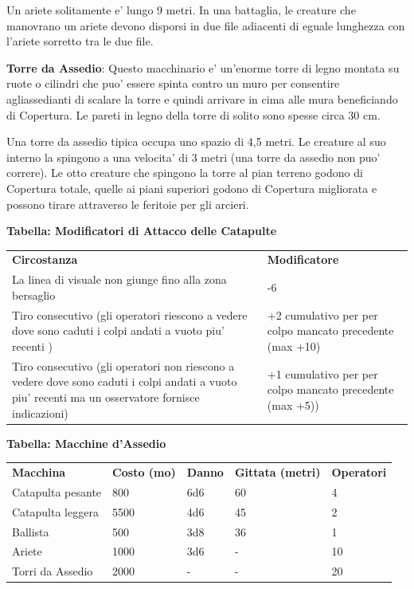\documentclass[a4paper,11pt,twoside,openany]{book}
\begin{document}
{Un ariete solitamente e' lungo 9 metri. In una battaglia, le creature che manovrano un ariete devono disporsi in due file adiacenti di eguale lunghezza con l'ariete sorretto tra le due file. 

\textbf{Torre da Assedio}: Questo macchinario e' un'enorme torre di legno montata su ruote o cilindri che puo' essere spinta contro un muro per consentire agliassedianti di scalare la torre e quindi arrivare in cima alle mura beneficiando di Copertura. Le pareti in legno della torre di solito sono spesse circa 30 cm.

Una torre da assedio tipica occupa uno spazio di 4,5 metri. Le creature al suo interno la spingono a una velocita' di 3 metri (una torre da assedio non puo' correre). Le otto creature che spingono la torre al pian terreno godono di Copertura totale, quelle ai piani superiori godono di Copertura migliorata e possono tirare attraverso le feritoie per gli arcieri.

\bigskip

\textbf{Tabella: Modificatori di Attacco delle Catapulte}

\begin{tabular}{L{10cm} L{6cm}} 
\toprule
\textbf{Circostanza} & \textbf{Modificatore}\tabularnewline
La linea di visuale non giunge fino alla zona bersaglio & -6\tabularnewline
Tiro consecutivo (gli operatori riescono a vedere dove sono caduti i colpi andati a vuoto piu' recenti ) &+2 cumulativo per per colpo  mancato precedente (max +10)\tabularnewline
Tiro consecutivo (gli operatori non riescono a vedere dove sono caduti i colpi andati a vuoto piu' recenti ma un osservatore fornisce indicazioni) & +1 cumulativo per per colpo mancato precedente (max +5))\tabularnewline
\end{tabular}

\bigskip

\textbf{Tabella: Macchine d'Assedio}

\medskip

\begin{tabular}{lllll}
\toprule
\textbf{Macchina} & \textbf{Costo (mo)} & \textbf{Danno} & \textbf{Gittata (metri)} & \textbf{Operatori}\tabularnewline
Catapulta pesante & 800 & 6d6 & 60 & 4\tabularnewline
Catapulta leggera & 5500 & 4d6 & 45 & 2\tabularnewline
Ballista & 500 & 3d8 & 36 & 1\tabularnewline
Ariete & 1000 & 3d6 & - & 10\tabularnewline
Torri da Assedio & 2000 & - & - & 20\tabularnewline
\end{tabular}

\bigskip

}
\end{document}
